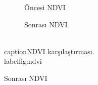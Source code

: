 \documentclass[11pt,a4paper]{article}
\begin{document}
\begin{figure}[H]
  \centering
  \begin{subfigure}[b]{0.48\textwidth}
    \centering
    \caption{Öncesi NDVI}
  \end{subfigure}\hfill
  \begin{subfigure}[b]{0.48\textwidth}
    \centering
    \caption{Sonrası NDVI}
  \end{subfigure}
  \\caption{NDVI karşılaştırması.}
  \\label{fig:ndvi}
\end{figure}
\FloatBarrier
\end{document}
